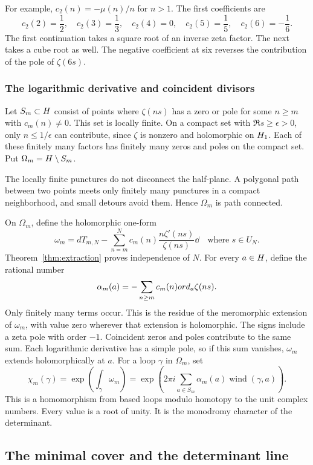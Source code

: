 For example, \(c_2(n)=-\mu(n)/n\) for \(n>1\).
The first coefficients are
\[
 c_2(2)=\frac12,\quad c_2(3)=\frac13,\quad c_2(4)=0,
 \quad c_2(5)=\frac15,\quad c_2(6)=-\frac16.
\]
The first continuation takes a square root of an inverse zeta factor.
The next takes a cube root as well.  The negative coefficient at six
reverses the contribution of the pole of \(\zeta(6s)\).

\subsubsection{The logarithmic derivative and coincident divisors}

Let \(S_m\subset H\) consist of points where \(\zeta(ns)\) has a
zero or pole for some \(n\geq m\) with \(c_m(n)\ne0\).
This set is locally finite.  On a compact set with \(\Re s\geq\epsilon>0\),
only \(n\leq1/\epsilon\) can contribute, since \(\zeta\) is nonzero
and holomorphic on \(H_1\).  Each of these finitely many factors
has finitely many zeros and poles on the compact set.
Put \(\Omega_m=H\setminus S_m\).

The locally finite punctures do not disconnect the half-plane.
A polygonal path between two points meets only finitely many punctures
in a compact neighborhood, and small detours avoid them.
Hence \(\Omega_m\) is path connected.

On \(\Omega_m\), define the holomorphic one-form
\[
 \omega_m=dT_{m,N}
 -\sum_{n=m}^N c_m(n)\frac{n\zeta'(ns)}{\zeta(ns)}\dd
 \quad\text{where }s\in U_N.
\]
Theorem~\ref{thm:extraction} proves independence of \(N\).
For every \(a\in H\), define the rational number
\[
 \alpha_m(a)=-\sum_{n\geq m}c_m(n)ord_a\zeta(ns).
\]
Only finitely many terms occur.  This is the residue of the meromorphic
extension of \(\omega_m\), with value zero wherever that extension is
holomorphic.  The signs include a zeta pole with order
\(-1\).  Coincident zeros and poles contribute to the same sum.
Each logarithmic derivative has a simple pole, so if this sum vanishes,
\(\omega_m\) extends holomorphically at \(a\).
For a loop \(\gamma\) in \(\Omega_m\), set
\[
 \chi_m(\gamma)=\exp\left(\int_\gamma\omega_m\right)
 =\exp\left(2\pi i\sum_{a\in S_m}
       \alpha_m(a)\operatorname{wind}(\gamma,a)\right).
\]
This is a homomorphism from based loops modulo homotopy to
the unit complex numbers.  Every value is a root of unity.
It is the monodromy character of the determinant.

\subsection{The minimal cover and the determinant line}

